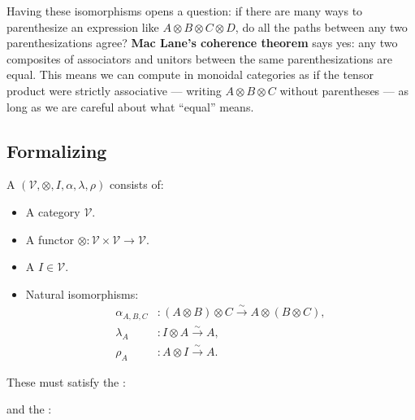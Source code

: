 Having these isomorphisms opens a question: if there are many ways to parenthesize
an expression like $A \otimes B \otimes C \otimes D$, do all the paths between
any two parenthesizations agree? \textbf{Mac Lane's coherence theorem} says yes:
any two composites of associators and unitors between the same parenthesizations
are equal. This means we can compute in monoidal categories as if the tensor
product were strictly associative — writing $A \otimes B \otimes C$ without
parentheses — as long as we are careful about what ``equal'' means.

\subsection{Formalizing}

\begin{definition}
A  $(\mathcal{V}, \otimes, I, \alpha, \lambda, \rho)$
consists of:
\begin{itemize}
  \item A category $\mathcal{V}$.
  \item A  functor $\otimes : \mathcal{V} \times \mathcal{V} \to \mathcal{V}$.
  \item A  $I \in \mathcal{V}$.
  \item Natural isomorphisms:
  \begin{align*}
    \alpha_{A,B,C} &: (A \otimes B) \otimes C \xrightarrow{\sim} A \otimes (B \otimes C),\\
    \lambda_A &: I \otimes A \xrightarrow{\sim} A, \\
    \rho_A   &: A \otimes I \xrightarrow{\sim} A.
  \end{align*}
\end{itemize}
These must satisfy the :
\begin{center}
\end{center}
and the :
\begin{center}
\end{center}
\end{definition}

